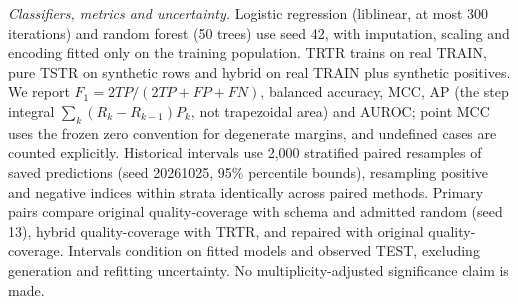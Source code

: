 \textit{Classifiers, metrics and uncertainty.} Logistic regression (liblinear, at most 300 iterations) and random forest (50 trees) use seed 42, with imputation, scaling and encoding fitted only on the training population. TRTR trains on real TRAIN, pure TSTR on synthetic rows and hybrid on real TRAIN plus synthetic positives. We report $F_1=2TP/(2TP+FP+FN)$, balanced accuracy, MCC, AP (the step integral $\sum_k(R_k-R_{k-1})P_k$, not trapezoidal area) and AUROC; point MCC uses the frozen zero convention for degenerate margins, and undefined cases are counted explicitly. Historical intervals use 2,000 stratified paired resamples of saved predictions (seed 20261025, 95\% percentile bounds), resampling positive and negative indices within strata identically across paired methods. Primary pairs compare original quality-coverage with schema and admitted random (seed 13), hybrid quality-coverage with TRTR, and repaired with original quality-coverage. Intervals condition on fitted models and observed TEST, excluding generation and refitting uncertainty. No multiplicity-adjusted significance claim is made.
